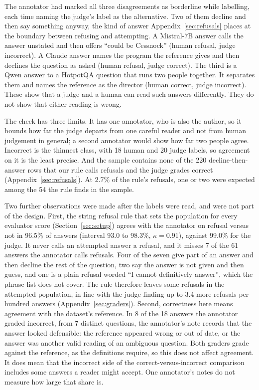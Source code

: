 \documentclass[11pt]{article}
\newcommand{\movedref}{Appendix}            %
\newcommand{\movedref}{Section}
\begin{document}
The annotator had marked all three disagreements as borderline while labelling, each time naming the judge's label as the alternative. Two of them decline and then say something anyway, the kind of answer \movedref~\ref{sec:refusals} places at the boundary between refusing and attempting. A Mistral-7B answer calls the answer unstated and then offers ``could be Cessnock'' (human refusal, judge incorrect). A Claude answer names the program the reference gives and then declines the question as asked (human refusal, judge correct). The third is a Qwen answer to a HotpotQA question that runs two people together. It separates them and names the reference as the director (human correct, judge incorrect). These show that a judge and a human can read such answers differently. They do not show that either reading is wrong.

The check has three limits. It has one annotator, who is also the author, so it bounds how far the judge departs from one careful reader and not from human judgement in general; a second annotator would show how far two people agree. Incorrect is the thinnest class, with 18 human and 20 judge labels, so agreement on it is the least precise. And the sample contains none of the 220 decline-then-answer rows that our rule calls refusals and the judge grades correct (\movedref~\ref{sec:refusals}). At 2.7\% of the rule's refusals, one or two were expected among the 54 the rule finds in the sample.

Two further observations were made after the labels were read, and were not part of the design. First, the string refusal rule that sets the population for every evaluator score (Section~\ref{sec:setup}) agrees with the annotator on refusal versus not in 96.5\% of answers (interval 93.0 to 98.3\%, $\kappa = 0.91$), against 99.0\% for the judge. It never calls an attempted answer a refusal, and it misses 7 of the 61 answers the annotator calls refusals. Four of the seven give part of an answer and then decline the rest of the question, two say the answer is not given and then guess, and one is a plain refusal worded ``I cannot definitively answer'', which the phrase list does not cover. The rule therefore leaves some refusals in the attempted population, in line with the judge finding up to 3.4 more refusals per hundred answers (\movedref~\ref{sec:graders}). Second, correctness here means agreement with the dataset's reference. In 8 of the 18 answers the annotator graded incorrect, from 7 distinct questions, the annotator's note records that the answer looked defensible: the reference appeared wrong or out of date, or the answer was another valid reading of an ambiguous question. Both graders grade against the reference, as the definitions require, so this does not affect agreement. It does mean that the incorrect side of the correct-versus-incorrect comparison includes some answers a reader might accept. One annotator's notes do not measure how large that share is.
\end{document}
